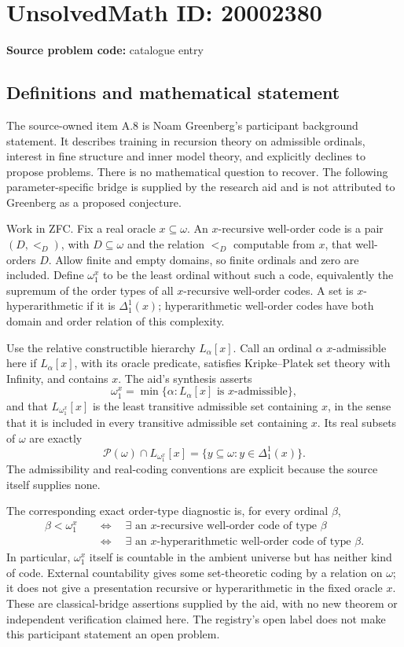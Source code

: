 \documentclass[11pt]{article}
\begin{document}
\section*{UnsolvedMath ID: 20002380}
\textbf{Source problem code:} catalogue entry
\subsection{Definitions and mathematical statement}
The source-owned item A.8 is Noam Greenberg's participant background statement. It describes training in recursion theory on admissible ordinals, interest in fine structure and inner model theory, and explicitly declines to propose problems. There is no mathematical question to recover. The following parameter-specific bridge is supplied by the research aid and is not attributed to Greenberg as a proposed conjecture.

Work in ZFC. Fix a real oracle \(x\subseteq\omega\). An \(x\)-recursive well-order code is a pair \((D,<_{D})\), with \(D\subseteq\omega\) and the relation \(<_D\) computable from \(x\), that well-orders \(D\). Allow finite and empty domains, so finite ordinals and zero are included. Define \(\omega_1^x\) to be the least ordinal without such a code, equivalently the supremum of the order types of all \(x\)-recursive well-order codes. A set is \(x\)-hyperarithmetic if it is \(\Delta^1_1(x)\); hyperarithmetic well-order codes have both domain and order relation of this complexity.

Use the relative constructible hierarchy \(L_\alpha[x]\). Call an ordinal \(\alpha\) \(x\)-admissible here if \(L_\alpha[x]\), with its oracle predicate, satisfies Kripke--Platek set theory with Infinity, and contains \(x\). The aid's synthesis asserts
\[
 \omega_1^x=\min\{\alpha:L_\alpha[x]\text{ is }x\text{-admissible}\},
\]
and that \(L_{\omega_1^x}[x]\) is the least transitive admissible set containing \(x\), in the sense that it is included in every transitive admissible set containing \(x\). Its real subsets of \(\omega\) are exactly
\[
 \mathcal P(\omega)\cap L_{\omega_1^x}[x]
 =\{y\subseteq\omega:y\in\Delta^1_1(x)\}.
\]
The admissibility and real-coding conventions are explicit because the source itself supplies none.

The corresponding exact order-type diagnostic is, for every ordinal \(\beta\),
\[
\begin{aligned}
 \beta<\omega_1^x
 &\quad\Longleftrightarrow\quad
 \exists\text{ an }x\text{-recursive well-order code of type }\beta\\
 &\quad\Longleftrightarrow\quad
 \exists\text{ an }x\text{-hyperarithmetic well-order code of type }\beta.
\end{aligned}
\]
In particular, \(\omega_1^x\) itself is countable in the ambient universe but has neither kind of code. External countability gives some set-theoretic coding by a relation on \(\omega\); it does not give a presentation recursive or hyperarithmetic in the fixed oracle \(x\). These are classical-bridge assertions supplied by the aid, with no new theorem or independent verification claimed here. The registry's open label does not make this participant statement an open problem.
\end{document}
